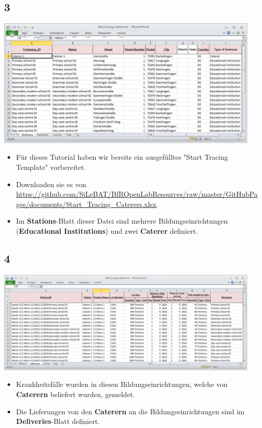 \documentclass{beamer}
\begin{document}
\subsection{3}
\begin{frame}
	\begin{center}
  		\includegraphics[width=0.95\textwidth]{3.png}
	\end{center}
	\begin{itemize}
		\item Für dieses Tutorial haben wir bereits ein ausgefülltes  "Start Tracing Template" vorbereitet.
		\item Downloaden sie es von \url{https://github.com/SiLeBAT/BfROpenLabResources/raw/master/GitHubPages/documents/Start_Tracing_Caterers.xlsx}.
		\item Im \textbf{Stations}-Blatt dieser Datei sind mehrere Bildungseinrichtungen (\textbf{Educational Institutions}) und zwei \textbf{Caterer} definiert.
	\end{itemize}
\end{frame}

\subsection{4}
\begin{frame}
	\begin{center}
  		\includegraphics[width=0.95\textwidth]{4.png}
	\end{center}
	\begin{itemize}
		\item Krankheitsfälle wurden in diesen Bildungseinrichtungen, welche von \textbf{Caterern} beliefert wurden, gemeldet.
		\item Die Lieferungen von den \textbf{Caterern} an die Bildungseinrichtungen sind im \textbf{Deliveries}-Blatt definiert.
	\end{itemize}
\end{frame}
\end{document}
